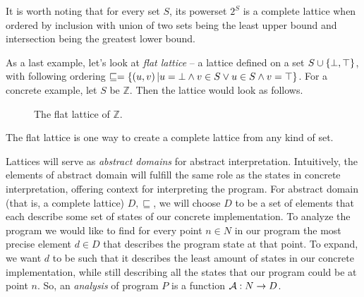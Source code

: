 \documentclass[..thesis.tex]{subfiles}
\begin{document}
It is worth noting that for every set $S$, its powerset $2^S$ is a complete lattice when ordered by inclusion with union of two sets being the least upper bound and
intersection being the greatest lower bound.

As a last example, let's look at \textit{flat lattice} -- a lattice defined on a set $S \cup \left\lbrace \bot, \top \right\rbrace$, 
with following ordering $\sqsubseteq = \left\lbrace \left(  u,v \right)  | u = \bot \land v \in S \lor  u \in S \land  v = \top \right\rbrace$.
For a concrete example, let $S$ be $\mathbb{Z}$. Then the lattice would look as follows.

\begin{figure}[H]
  \begin{center}
  \end{center}
  \caption{The flat lattice of $\mathbb{Z}$.}
\end{figure}

The flat lattice is one way to create a complete lattice from any kind of set.


Lattices will serve as \textit{abstract domains} for abstract interpretation.
Intuitively, the elements of abstract domain will fulfill the same role as the states in concrete interpretation, offering context for interpreting the program.
For abstract domain (that is, a complete lattice) $D,\sqsubseteq$,
we will choose $D$ to be a set of elements that each describe some set of states of our concrete implementation.
To analyze the program we would like to find for every point $n \in N$ in our program the most precise element $d \in D$ that describes the program state at that point.
To expand, we want $d$ to be such that it describes the least amount of states in our concrete implementation,
while still describing all the states that our program could be at point $n$. So, an \textit{analysis} of program $P$ is a function $\mathcal{A} : N \to D$.
\end{document}
